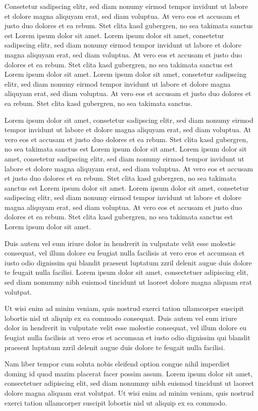 Consetetur sadipscing elitr, sed diam nonumy eirmod tempor invidunt ut labore et dolore magna aliquyam erat, sed diam voluptua. At vero eos et accusam et justo duo dolores et ea rebum. Stet clita kasd gubergren, no sea takimata sanctus est Lorem ipsum dolor sit amet. Lorem ipsum dolor sit amet, consetetur sadipscing elitr, sed diam nonumy eirmod tempor invidunt ut labore et dolore magna aliquyam erat, sed diam voluptua. At vero eos et accusam et justo duo dolores et ea rebum. Stet clita kasd gubergren, no sea takimata sanctus est Lorem ipsum dolor sit amet. Lorem ipsum dolor sit amet, consetetur sadipscing elitr, sed diam nonumy eirmod tempor invidunt ut labore et dolore magna aliquyam erat, sed diam voluptua. At vero eos et accusam et justo duo dolores et ea rebum. Stet clita kasd gubergren, no sea takimata sanctus.

Lorem ipsum dolor sit amet, consetetur sadipscing elitr, sed diam nonumy eirmod tempor invidunt ut labore et dolore magna aliquyam erat, sed diam voluptua. At vero eos et accusam et justo duo dolores et ea rebum. Stet clita kasd gubergren, no sea takimata sanctus est Lorem ipsum dolor sit amet. Lorem ipsum dolor sit amet, consetetur sadipscing elitr, sed diam nonumy eirmod tempor invidunt ut labore et dolore magna aliquyam erat, sed diam voluptua. At vero eos et accusam et justo duo dolores et ea rebum. Stet clita kasd gubergren, no sea takimata sanctus est Lorem ipsum dolor sit amet. Lorem ipsum dolor sit amet, consetetur sadipscing elitr, sed diam nonumy eirmod tempor invidunt ut labore et dolore magna aliquyam erat, sed diam voluptua. At vero eos et accusam et justo duo dolores et ea rebum. Stet clita kasd gubergren, no sea takimata sanctus est Lorem ipsum dolor sit amet.

Duis autem vel eum iriure dolor in hendrerit in vulputate velit esse molestie consequat, vel illum dolore eu feugiat nulla facilisis at vero eros et accumsan et iusto odio dignissim qui blandit praesent luptatum zzril delenit augue duis dolore te feugait nulla facilisi. Lorem ipsum dolor sit amet, consectetuer adipiscing elit, sed diam nonummy nibh euismod tincidunt ut laoreet dolore magna aliquam erat volutpat.

Ut wisi enim ad minim veniam, quis nostrud exerci tation ullamcorper suscipit lobortis nisl ut aliquip ex ea commodo consequat. Duis autem vel eum iriure dolor in hendrerit in vulputate velit esse molestie consequat, vel illum dolore eu feugiat nulla facilisis at vero eros et accumsan et iusto odio dignissim qui blandit praesent luptatum zzril delenit augue duis dolore te feugait nulla facilisi.

Nam liber tempor cum soluta nobis eleifend option congue nihil imperdiet doming id quod mazim placerat facer possim assum. Lorem ipsum dolor sit amet, consectetuer adipiscing elit, sed diam nonummy nibh euismod tincidunt ut laoreet dolore magna aliquam erat volutpat. Ut wisi enim ad minim veniam, quis nostrud exerci tation ullamcorper suscipit lobortis nisl ut aliquip ex ea commodo.
